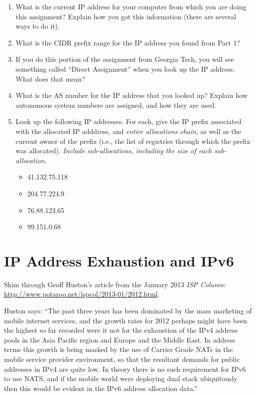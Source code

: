 \documentclass[11pt]{article}
\begin{document}
\begin{enumerate}
\item What is the current IP address for your computer from which you
  are doing this assignment? Explain how you got this information (there
  are several ways to do it).
\item What is the CIDR prefix range for the IP address you found from
  Part 1?
\item If you do this portion of the assignment from Georgia Tech, you
  will see something called ``Direct Assignment'' when you look up the
  IP address.  What does that mean?
\item What is the AS number for the IP address that you looked up?
  Explain how autonomous system numbers are assigned, and how they are
  used.
\item Look up the following IP addresses.  For each, give the IP prefix
  associated with the allocated IP adddress, and {\em
  entire allocations chain}, as well as the current owner of the prefix
  (i.e., the list of registries through which the prefix was
  allocated). {\em Include sub-allocations, including the size of each
    sub-allocation.} 
\begin{itemize}
\item 41.132.75.118
\item 204.77.224.9
\item 76.88.123.65
\item 99.151.0.68 
\end{itemize}
\end{enumerate}

\section{IP Address Exhaustion and IPv6}


Skim through Geoff Huston's article from the January 2013 {\em ISP Column}:
\url{http://www.potaroo.net/ispcol/2013-01/2012.html}.  

Huston says: ``The past three years has been dominated by the mass
marketing of mobile internet services, and the growth rates for 2012
perhaps might have been the highest so far recorded were it not for the
exhaustion of the IPv4 address pools in the Asia Pacific region and
Europe and the Middle East. In address terms this growth is being masked
by the use of Carrier Grade NATs in the mobile service provider
environment, so that the resultant demands for public addresses in IPv4
are quite low. In theory there is no such requirement for IPv6 to use
NATS, and if the mobile world were deploying dual stack ubiquitously
then this would be evident in the IPv6 address allocation data.''
\end{document}
